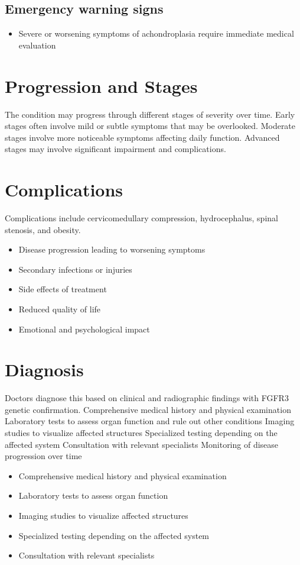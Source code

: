 \subsection{Emergency warning signs}
\begin{itemize}[noitemsep]
  \item Severe or worsening symptoms of achondroplasia require immediate medical evaluation
\end{itemize}
\section{Progression and Stages}
The condition may progress through different stages of severity over time. Early stages often involve mild or subtle symptoms that may be overlooked. Moderate stages involve more noticeable symptoms affecting daily function. Advanced stages may involve significant impairment and complications.
\section{Complications}
Complications include cervicomedullary compression, hydrocephalus, spinal stenosis, and obesity.

\begin{itemize}[noitemsep]
  \item Disease progression leading to worsening symptoms
  \item Secondary infections or injuries
  \item Side effects of treatment
  \item Reduced quality of life
  \item Emotional and psychological impact
\end{itemize}
\section{Diagnosis}
Doctors diagnose this based on clinical and radiographic findings with FGFR3 genetic confirmation. Comprehensive medical history and physical examination Laboratory tests to assess organ function and rule out other conditions Imaging studies to visualize affected structures Specialized testing depending on the affected system Consultation with relevant specialists Monitoring of disease progression over time

\begin{itemize}[noitemsep]
  \item Comprehensive medical history and physical examination
  \item Laboratory tests to assess organ function
  \item Imaging studies to visualize affected structures
  \item Specialized testing depending on the affected system
  \item Consultation with relevant specialists
\end{itemize}
